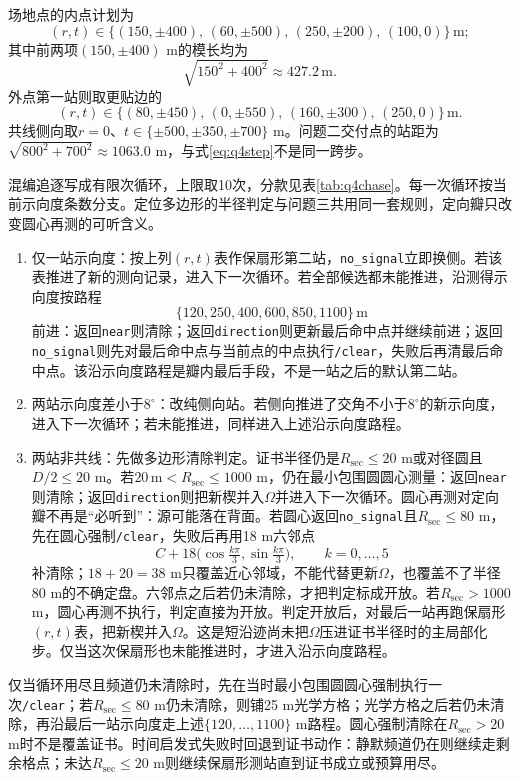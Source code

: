 \documentclass{cumcmthesis}
\begin{document}
场地点的内点计划为
\[
(r,t)\in\bigl\{(150,\pm 400),\,(60,\pm 500),\,(250,\pm 200),\,(100,0)\bigr\}\,\mathrm{m};
\]
其中前两项$(150,\pm 400)$ m的模长均为
\begin{equation}
\sqrt{150^2+400^2}\approx 427.2\,\mathrm{m}.
\label{eq:q4step}
\end{equation}
外点第一站则取更贴边的
\[
(r,t)\in\bigl\{(80,\pm 450),\,(0,\pm 550),\,(160,\pm 300),\,(250,0)\bigr\}\,\mathrm{m}.
\]
共线侧向取$r=0$、$t\in\{\pm 500,\pm 350,\pm 700\}$ m。问题二交付点的站距为$\sqrt{800^2+700^2}\approx 1063.0$ m，与式\eqref{eq:q4step}不是同一跨步。

混编追逐写成有限次循环，上限取10次，分款见表\ref{tab:q4chase}。每一次循环按当前示向度条数分支。定位多边形的半径判定与问题三共用同一套规则，定向瓣只改变圆心再测的可听含义。

\begin{enumerate}
\item 仅一站示向度：按上列$(r,t)$表作保扇形第二站，\texttt{no\_signal}立即换侧。若该表推进了新的测向记录，进入下一次循环。若全部候选都未能推进，沿测得示向度按路程
\[
\{120,250,400,600,850,1100\}\,\mathrm{m}
\]
前进：返回\texttt{near}则清除；返回\texttt{direction}则更新最后命中点并继续前进；返回\texttt{no\_signal}则先对最后命中点与当前点的中点执行\texttt{/clear}，失败后再清最后命中点。该沿示向度路程是瓣内最后手段，不是一站之后的默认第二站。
\item 两站示向度差小于$8^\circ$：改纯侧向站。若侧向推进了交角不小于$8^\circ$的新示向度，进入下一次循环；若未能推进，同样进入上述沿示向度路程。
\item 两站非共线：先做多边形清除判定。证书半径仍是$R_{\mathrm{sec}}\le 20$ m或对径圆且$D/2\le 20$ m。若$20\,\mathrm{m}<R_{\mathrm{sec}}\le 1000$ m，仍在最小包围圆圆心测量：返回\texttt{near}则清除；返回\texttt{direction}则把新楔并入$\Omega$并进入下一次循环。圆心再测对定向瓣不再是“必听到”：源可能落在背面。若圆心返回\texttt{no\_signal}且$R_{\mathrm{sec}}\le 80$ m，先在圆心强制\texttt{/clear}，失败后再用18 m六邻点
\[
C+18\bigl(\cos\tfrac{k\pi}{3},\sin\tfrac{k\pi}{3}\bigr),\qquad k=0,\ldots,5
\]
补清除；$18+20=38$ m只覆盖近心邻域，不能代替更新$\Omega$，也覆盖不了半径80 m的不确定盘。六邻点之后若仍未清除，才把判定标成开放。若$R_{\mathrm{sec}}>1000$ m，圆心再测不执行，判定直接为开放。判定开放后，对最后一站再跑保扇形$(r,t)$表，把新楔并入$\Omega$。这是短沿迹尚未把$\Omega$压进证书半径时的主局部化步。仅当这次保扇形也未能推进时，才进入沿示向度路程。
\end{enumerate}

仅当循环用尽且频道仍未清除时，先在当时最小包围圆圆心强制执行一次\texttt{/clear}；若$R_{\mathrm{sec}}\le 80$ m仍未清除，则铺25 m光学方格；光学方格之后若仍未清除，再沿最后一站示向度走上述$\{120,\ldots,1100\}$ m路程。圆心强制清除在$R_{\mathrm{sec}}>20$ m时不是覆盖证书。时间启发式失败时回退到证书动作：静默频道仍在则继续走剩余格点；未达$R_{\mathrm{sec}}\le 20$ m则继续保扇形测站直到证书成立或预算用尽。
\end{document}
